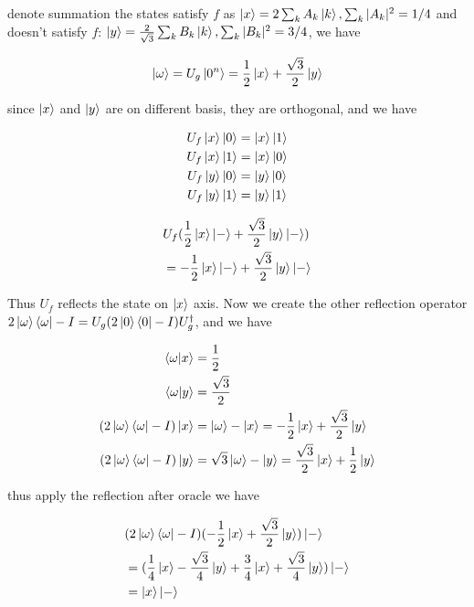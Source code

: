 \documentclass{article}
\begin{document}
denote summation the states satisfy $f$ as $\ket{x} = 2\sum_k A_k \ket{k}, \sum_k |A_k|^2 = 1/4$
and doesn't satisfy $f$: $\ket{y} = \frac{2}{\sqrt{3}}\sum_k B_k \ket{k}, \sum_k |B_k|^2 = 3/4$, we have

$$
\ket{\omega} = U_g \ket{0^n} = \frac{1}{2}\ket{x} + \frac{\sqrt{3}}{2}\ket{y}
$$

since $\ket{x}$ and $\ket{y}$ are on different basis, they are orthogonal, and we have

$$
\begin{aligned}
    U_f \ket{x}\ket{0} &= \ket{x}\ket{1}\\
    U_f \ket{x}\ket{1} &= \ket{x}\ket{0}\\
    U_f \ket{y}\ket{0} &= \ket{y}\ket{0}\\
    U_f \ket{y}\ket{1} &= \ket{y}\ket{1}\\
\end{aligned}
$$

$$
\begin{aligned}
    & U_f (\frac{1}{2} \ket{x}\ket{-} + \frac{\sqrt{3}}{2}\ket{y}\ket{-})\\
    &= -\frac{1}{2}\ket{x}\ket{-} + \frac{\sqrt{3}}{2}\ket{y}\ket{-}
\end{aligned}
$$

Thus $U_f$ reflects the state on $\ket{x}$ axis. Now we create the other reflection
operator $2\ket{\omega}\bra{\omega} - I = U_g (2\ket{0}\bra{0} - I) U_g^{\dag}$, and we
have

$$
\begin{aligned}
    \bra{\omega}\ket{x} &= \frac{1}{2}\\
    \bra{\omega}\ket{y} &= \frac{\sqrt{3}}{2}\\
    (2\ket{\omega}\bra{\omega}-I)\ket{x} &= \ket{\omega} - \ket{x} = -\frac{1}{2}\ket{x} + \frac{\sqrt{3}}{2}\ket{y}\\
    (2\ket{\omega}\bra{\omega}-I)\ket{y} &= \sqrt{3}\ket{\omega} - \ket{y} = \frac{\sqrt{3}}{2}\ket{x} + \frac{1}{2}\ket{y}\\
\end{aligned}
$$

thus apply the reflection after oracle we have

$$
\begin{aligned}
    &(2\ket{\omega}\bra{\omega} - I)(-\frac{1}{2}\ket{x} + \frac{\sqrt{3}}{2}\ket{y})\ket{-}\\
    &=(\frac{1}{4}\ket{x} - \frac{\sqrt{3}}{4}\ket{y} + \frac{3}{4}\ket{x} + \frac{\sqrt{3}}{4}\ket{y})\ket{-}\\
    &=\ket{x}\ket{-}
\end{aligned}
$$
\end{document}
